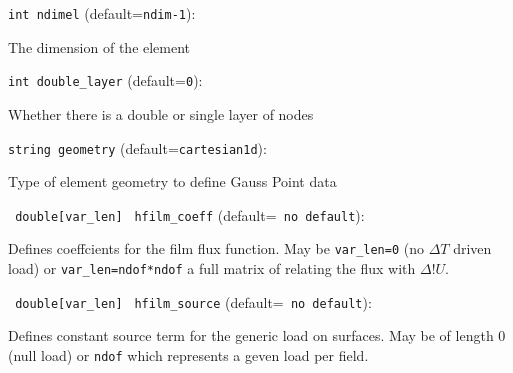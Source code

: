 \item\verb+int ndimel+ {\rm(default=\verb|ndim-1|)}:

The dimension of the element 

\item\verb+int double_layer+ {\rm(default=\verb|0|)}:

Whether there is a double or single layer of nodes

\item\verb+string geometry+ {\rm(default=\verb|cartesian1d|)}:

Type of element geometry to define Gauss Point data

\item\verb+ double[var_len]+ \verb+ hfilm_coeff+ {\rm(default=\verb| no default|)}:
 
Defines coeffcients for the film flux function. May be 
\verb+var_len=0+ (no $\Delta T$ driven load) or
\verb+var_len=ndof*ndof+ a full matrix of relating the flux with
$\Delta !U$. 
\item\verb+ double[var_len]+ \verb+ hfilm_source+ {\rm(default=\verb| no default|)}:
 
Defines constant source term for the generic load on
surfaces. May be of length 0 (null load) or \verb+ndof+
which represents a geven load per field. 
